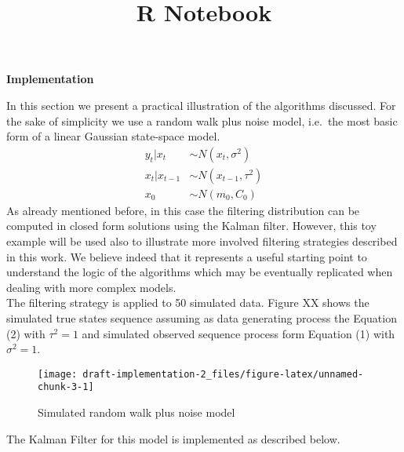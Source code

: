 \documentclass[
]{article}
\title{R Notebook}
\author{}
\date{\vspace{-2.5em}}
\begin{document}
\maketitle

\textbf{Implementation}

In this section we present a practical illustration of the algorithms
discussed. For the sake of simplicity we use a random walk plus noise
model, i.e.~the most basic form of a linear Gaussian state-space model.
\begin{align}
y_{t}|x_{t} & \sim N(x_{t},\sigma^{2}) \\
x_{t}|x_{t-1} & \sim N(x_{t-1},\tau^{2}) \\
x_{0} & \sim N(m_{0},C_{0})
\end{align} As already mentioned before, in this case the filtering
distribution can be computed in closed form solutions using the Kalman
filter. However, this toy example will be used also to illustrate more
involved filtering strategies described in this work. We believe indeed
that it represents a useful starting point to understand the logic of
the algorithms which may be eventually replicated when dealing with more
complex models.\\
The filtering strategy is applied to 50 simulated data. Figure XX shows
the simulated true states sequence assuming as data generating process
the Equation (2) with \(\tau^{2}=1\) and simulated observed sequence
process form Equation (1) with \(\sigma^{2}=1\).

\begin{figure}[ht]

{\centering \texttt{[image: draft-implementation-2\_files/figure-latex/unnamed-chunk-3-1]} 

}

\caption{Simulated random walk plus noise model}\label{fig:unnamed-chunk-3}
\end{figure}

The Kalman Filter for this model is implemented as described below.
\end{document}
